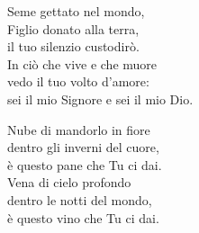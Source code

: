 
\strofa Seme gettato nel mondo,\\
Figlio donato alla terra,\\
il tuo silenzio custodirò.\\
In ciò che vive e che muore\\
vedo il tuo volto d'amore:\\
sei il mio Signore e sei il mio Dio.

\spazio


\spazio

\strofa Nube di mandorlo in fiore\\
dentro gli inverni del cuore,\\
è questo pane che Tu ci dai.\\
Vena di cielo profondo\\
dentro le notti del mondo,\\
è questo vino che Tu ci dai.

\spazio


\spazio
 
